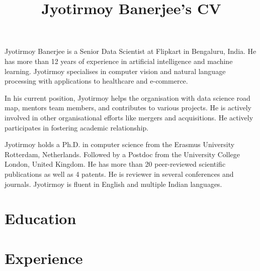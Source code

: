 \documentclass[a4paper,online]{adcv}
\title{Jyotirmoy Banerjee’s CV}
\begin{document}
Jyotirmoy Banerjee is a Senior Data Scientist at Flipkart in Bengaluru, India. He has more than 12 years of experience in artificial intelligence and machine learning.
Jyotirmoy specialises in computer vision and natural language processing with applications to healthcare and e-commerce.

In his current position, Jyotirmoy helps the organisation with data science road map, mentors team members, and contributes to various projects. 
He is actively involved in other organisational efforts like mergers and acquisitions. He actively participates in fostering academic relationship.

Jyotirmoy holds a Ph.D. in computer science from the Erasmus University Rotterdam, Netherlands. Followed by a Postdoc from the University College London, United Kingdom. He has more than 20 peer-reviewed scientific publications as well as 4 patents. He is reviewer in several conferences and journals.
Jyotirmoy is fluent in English and multiple Indian languages.

\section{Education}

\begin{adcvtabletwo}
\end{adcvtabletwo}


\section{Experience}
\end{document}
